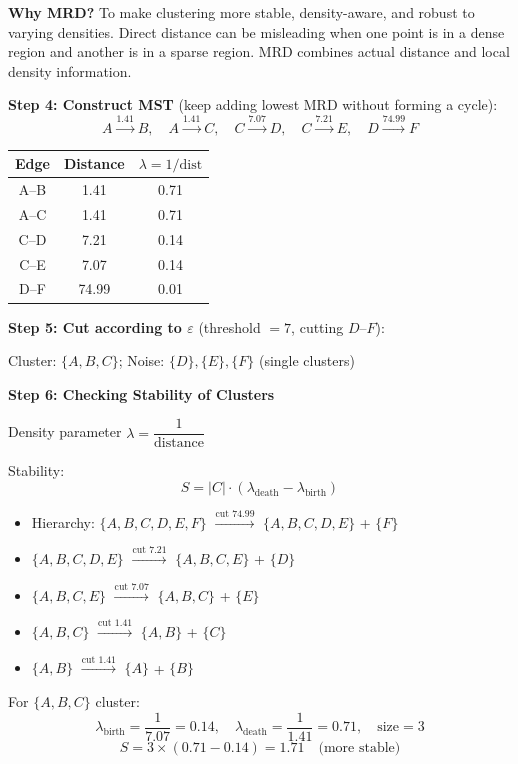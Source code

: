 \documentclass[12pt,a4paper]{article}
\begin{document}
\begin{examplebox}
\textbf{Why MRD?} To make clustering more stable, density-aware, and robust to varying densities. Direct distance can be misleading when one point is in a dense region and another is in a sparse region. MRD combines actual distance and local density information.

\textbf{Step 4: Construct MST} (keep adding lowest MRD without forming a cycle):
\[
A \xrightarrow{1.41} B,\quad A \xrightarrow{1.41} C,\quad C \xrightarrow{7.07} D,\quad C \xrightarrow{7.21} E,\quad D \xrightarrow{74.99} F
\]

\begin{center}
\begin{tabular}{ccc}
\toprule
Edge & Distance & $\lambda = 1/\text{dist}$ \\
\midrule
A--B & 1.41 & 0.71 \\
A--C & 1.41 & 0.71 \\
C--D & 7.21 & 0.14 \\
C--E & 7.07 & 0.14 \\
D--F & 74.99 & 0.01 \\
\bottomrule
\end{tabular}
\end{center}

\textbf{Step 5: Cut according to $\varepsilon$} (threshold $= 7$, cutting $D$--$F$):

Cluster: $\{A, B, C\}$; Noise: $\{D\}, \{E\}, \{F\}$ (single clusters)

\textbf{Step 6: Checking Stability of Clusters}

Density parameter $\lambda = \dfrac{1}{\text{distance}}$

Stability:
\[
S = |C| \cdot (\lambda_{\text{death}} - \lambda_{\text{birth}})
\]

\begin{itemize}
  \item Hierarchy: $\{A,B,C,D,E,F\}$ $\xrightarrow{\text{cut }74.99}$ $\{A,B,C,D,E\}$ + $\{F\}$
  \item $\{A,B,C,D,E\}$ $\xrightarrow{\text{cut }7.21}$ $\{A,B,C,E\}$ + $\{D\}$
  \item $\{A,B,C,E\}$ $\xrightarrow{\text{cut }7.07}$ $\{A,B,C\}$ + $\{E\}$
  \item $\{A,B,C\}$ $\xrightarrow{\text{cut }1.41}$ $\{A,B\}$ + $\{C\}$
  \item $\{A,B\}$ $\xrightarrow{\text{cut }1.41}$ $\{A\}$ + $\{B\}$
\end{itemize}

For $\{A,B,C\}$ cluster:
\[
\lambda_{\text{birth}} = \frac{1}{7.07} = 0.14, \quad \lambda_{\text{death}} = \frac{1}{1.41} = 0.71, \quad \text{size} = 3
\]
\[
S = 3 \times (0.71 - 0.14) = 1.71 \quad \text{(more stable)}
\]


\end{examplebox}
\end{document}

